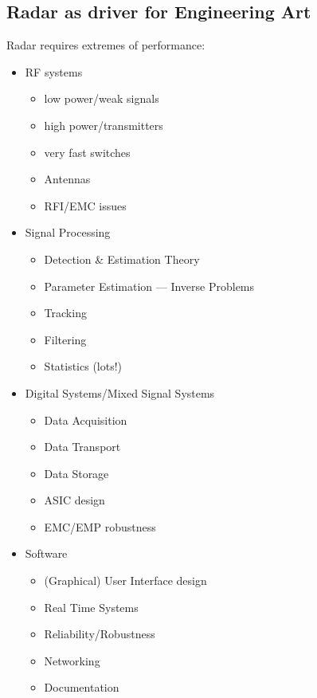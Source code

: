\subsection{Radar as driver for Engineering Art}

Radar requires extremes of performance:
\begin{itemize}
\item RF systems
  \begin{itemize}
  \item low power/weak signals
  \item high power/transmitters
  \item very fast switches
  \item Antennas
  \item RFI/EMC issues
  \end{itemize}
\item Signal Processing
  \begin{itemize}
  \item Detection \& Estimation Theory
  \item Parameter Estimation --- Inverse Problems
  \item Tracking
  \item Filtering
  \item Statistics (lots!)
  \end{itemize}
\item Digital Systems/Mixed Signal Systems
  \begin{itemize}
  \item Data Acquisition
  \item Data Transport
  \item Data Storage
  \item ASIC design
  \item EMC/EMP robustness
  \end{itemize}
\item Software
  \begin{itemize}
  \item (Graphical) User Interface design
  \item Real Time Systems
  \item Reliability/Robustness
  \item Networking
  \item Documentation
  \end{itemize}
\end{itemize}


